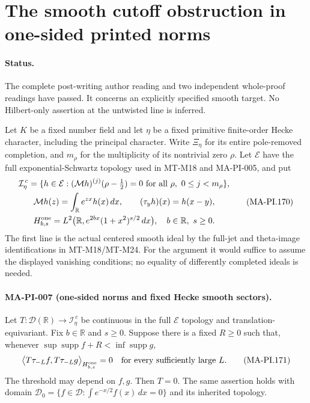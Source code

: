 \section{The smooth cutoff obstruction in one-sided printed norms}
\label{sec:printed-equivariant-cutoff-obstruction}

\paragraph{Status.}
The complete post-writing author reading and two independent
whole-proof readings have passed.
It concerns an explicitly specified smooth target.
No Hilbert-only assertion at the untwisted line is inferred.

Let \(K\) be a fixed number field and let \(\eta\) be a fixed
primitive finite-order Hecke character, including the principal
character.  Write \(\Xi_\eta\) for its entire pole-removed
completion, and \(m_\rho\) for the multiplicity of its
nontrivial zero \(\rho\).
Let \(\mathcal E\) have the full exponential-Schwartz
topology used in MT-M18 and MA-PI-005, and put
\[
 \begin{gathered}
  \mathcal I_\eta^{\,c}
   =\{h\in\mathcal E:
       (\mathcal Mh)^{(j)}(\rho-\tfrac12)=0
       \text{ for all }\rho,\ 0\le j<m_\rho\},\\
  \mathcal Mh(z)=\int_{\mathbb R}e^{zx}h(x)\,dx,\qquad
  (\tau_yh)(x)=h(x-y),\\
  H^{\rm one}_{b,s}
   =L^2\bigl(\mathbb R,e^{2bx}(1+x^2)^{s/2}\,dx\bigr),
       \quad b\in\mathbb R,\ s\ge0 .
 \end{gathered}
 \tag{MA-PI.170}
\]
The first line is the actual centered smooth ideal by
the full-jet and theta-image identifications in MT-M18/MT-M24.
For the argument it would suffice to assume the displayed
vanishing conditions; no equality of differently completed
ideals is needed.

\paragraph{MA-PI-007 (one-sided norms and fixed Hecke smooth sectors).}
Let \(T:\mathcal D(\mathbb R)\to\mathcal I_\eta^{\,c}\)
be continuous in the full \(\mathcal E\) topology and
translation-equivariant.  Fix \(b\in\mathbb R\) and \(s\ge0\).
Suppose there is a fixed \(R\ge0\) such that, whenever
\(\sup\operatorname{supp}f+R<\inf\operatorname{supp}g\),
\[
 \big\langle T\tau_{-L}f,T\tau_{-L}g
                      \big\rangle_{H^{\rm one}_{b,s}}=0
       \quad\text{for every sufficiently large }L .
 \tag{MA-PI.171}
\]
The threshold may depend on \(f,g\).
Then \(T=0\).
The same assertion holds with domain
\(\mathcal D_0=\{f\in\mathcal D:\int e^{-x/2}f(x)\,dx=0\}\)
and its inherited topology.

